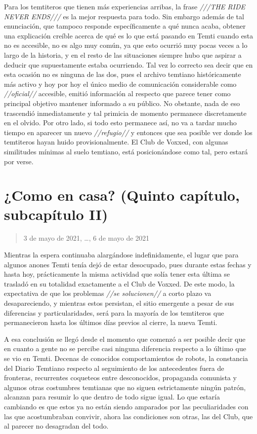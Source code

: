 \documentclass[
  spanish,
]{book}
\begin{document}
Para los temtiteros que tienen más experiencias arribas, la frase \emph{///THE RIDE NEVER ENDS///} es la mejor respuesta para todo. Sin embargo además de tal enunciación, que tampoco responde específicamente a qué nunca acaba, obtener una explicación creíble acerca de qué es lo que está pasando en Temti cuando esta no es accesible, no es algo muy común, ya que esto ocurrió muy pocas veces a lo largo de la historia, y en el resto de las situaciones siempre hubo que aspirar a deducir que supuestamente estaba ocurriendo. Tal vez lo correcto sea decir que en esta ocasión no es ninguna de las dos, pues el archivo temtiano históricamente más activo y hoy por hoy el único medio de comunicación considerable como \emph{//oficial//} accesible, emitió información al respecto que parece tener como principal objetivo mantener informado a su público. No obstante, nada de eso trascendió inmediatamente y tal primicia de momento permanece discretamente en el olvido. Por otro lado, si todo esto permanece así, no va a tardar mucho tiempo en aparecer un nuevo \emph{//refugio//} y entonces que sea posible ver donde los temtiteros hayan huido provisionalmente. El Club de Voxxed, con algunas similitudes mínimas al suelo temtiano, está posicionándose como tal, pero estará por verse.

\hypertarget{como-en-casa-quinto-capuxedtulo-subcapuxedtulo-ii}{%
\section{¿Como en casa? (Quinto capítulo, subcapítulo II)}\label{como-en-casa-quinto-capuxedtulo-subcapuxedtulo-ii}}

\begin{quote}
3 de mayo de 2021, \ldots, 6 de mayo de 2021
\end{quote}

Mientras la espera continuaba alargándose indefinidamente, el lugar que para algunos anones Temti tenía dejó de estar desocupado, pues durante estas fechas y hasta hoy, prácticamente la misma actividad que solía tener esta última se trasladó en su totalidad exactamente a el Club de Voxxed. De este modo, la expectativa de que los problemas \emph{//se solucionen//} a corto plazo va desapareciendo, y mientras estos persistan, el sitio emergente a pesar de sus diferencias y particularidades, será para la mayoría de los temtiteros que permanecieron hasta los últimos días previos al cierre, la nueva Temti.

A esa conclusión se llegó desde el momento que comenzó a ser posible decir que en cuanto a gente no se percibe casi ninguna diferencia respecto a lo último que se vio en Temti. Decenas de conocidos comportamientos de robots, la constancia del Diario Temtiano respecto al seguimiento de los antecedentes fuera de fronteras, recurrentes coqueteos entre desconocidos, propaganda comunista y algunos otras costumbres temtianas que no siguen estrictamente ningún patrón, alcanzan para resumir lo que dentro de todo sigue igual. Lo que estaría cambiando es que estos ya no están siendo amparados por las peculiaridades con las que acostumbraban convivir, ahora las condiciones son otras, las del Club, que al parecer no desagradan del todo.
\end{document}
